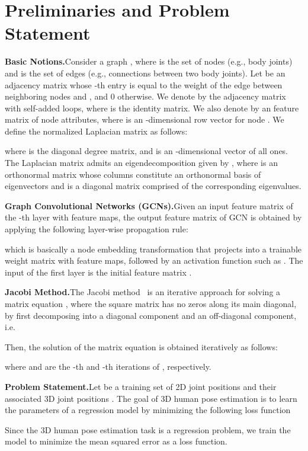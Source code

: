 \documentclass{bmvc2k}
\begin{document}
\section{Preliminaries and Problem Statement}
\noindent\textbf{Basic Notions.}\quad Consider a graph , where  is the set of  nodes (e.g., body joints) and  is the set of edges (e.g., connections between two body joints). Let  be an  adjacency matrix whose -th entry is equal to the weight of the edge between neighboring nodes  and , and 0 otherwise. We denote by  the adjacency matrix with self-added loops, where  is the identity matrix. We also denote by  an  feature matrix of node attributes, where  is an -dimensional row vector for node . We define the normalized Laplacian matrix as follows:

where  is the diagonal degree matrix, and  is an -dimensional vector of all ones. The Laplacian matrix admits an eigendecomposition given by , where  is an orthonormal matrix whose columns constitute an orthonormal basis of eigenvectors and  is a diagonal matrix comprised of the corresponding eigenvalues.

\medskip\noindent\textbf{Graph Convolutional Networks (GCNs).}\quad Given an input feature matrix  of the -th layer with  feature maps, the output feature matrix  of GCN is obtained by applying the following layer-wise propagation rule:

which is basically a node embedding transformation that projects  into a trainable weight matrix  with  feature maps, followed by an activation function  such as . The input of the first layer is the initial feature matrix .

\medskip\noindent\textbf{Jacobi Method.}\quad The Jacobi method~\cite{Saad:03} is an iterative approach for solving a matrix equation , where the square matrix  has no zeros along its main diagonal, by first decomposing  into a diagonal component and an off-diagonal component, i.e.

Then, the solution of the matrix equation  is obtained iteratively as follows:

where  and  are the -th and -th iterations of , respectively.

\medskip\noindent\textbf{Problem Statement.}\quad Let  be a training set of 2D joint positions  and their associated 3D joint positions . The goal of 3D human pose estimation is to learn the parameters  of a regression model  by minimizing the following loss function

Since the 3D human pose estimation task is a regression problem, we train the model to minimize the mean squared error as a loss function.
\end{document}
